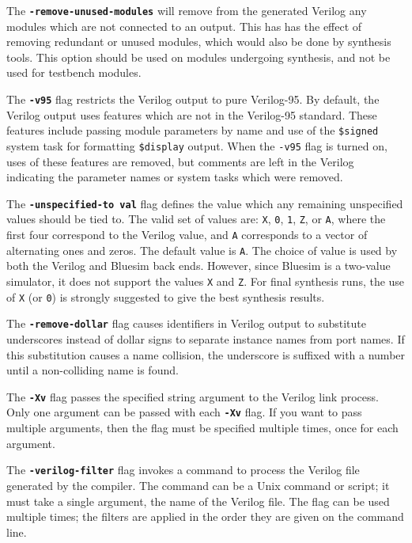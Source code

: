 \documentclass{article}
\begin{document}
The {\bf\tt -remove-unused-modules} will remove from the generated
Verilog any modules which are not connected to an
output.  This has has the effect of removing redundant or unused
modules, which would also be done by synthesis tools.   This option
should be used on modules undergoing synthesis, and not be used for
testbench modules.

The {\bf\tt -v95} flag restricts the Verilog output to pure Verilog-95.
By default, the Verilog output uses features which are not in the
Verilog-95 standard.  These features include passing module
parameters by name and use of the {\tt \$signed} system task for formatting
{\tt \$display} output.  When the {\tt -v95} flag is turned on, uses
of these features are removed, but comments are left in the Verilog
indicating the parameter names or system tasks which were removed.

The {\bf\tt -unspecified-to val} flag defines the value
which any remaining unspecified values should be tied to.  The valid
set of values are: {\tt X}, {\tt 0}, {\tt 1}, {\tt Z}, or {\tt A},
where the first four correspond to the Verilog value, and {\tt A}
corresponds to a vector of alternating ones and zeros.
The default value is {\tt A}.  The choice of value is used by both
the Verilog and Bluesim back ends.  However, since Bluesim is a two-value
simulator, it does not support the values {\tt X} and {\tt Z}.
For final synthesis runs, the use of {\tt X} (or {\tt 0})
is strongly suggested to give the best synthesis results.

The {\bf\tt -remove-dollar} flag causes identifiers in Verilog output
to substitute underscores instead of dollar signs to separate instance
names from port names.  If this substitution causes a name collision,
the underscore is suffixed with a number until a non-colliding name is
found.

The {\bf\tt -Xv} flag passes the specified string argument to the Verilog link
process.   Only one argument can be passed with each {\bf\tt -Xv}
flag. If you want to pass multiple arguments, then the flag must be
specified multiple times, once for each argument.

The {\bf\tt -verilog-filter} flag invokes a command to process the
 Verilog file generated by the compiler.  The command can be a Unix
 command or script;
it must take a single argument, the name of the Verilog file.    The
 flag can be used multiple times; the filters are applied in the order
 they are given on the command line.


\end{document}
